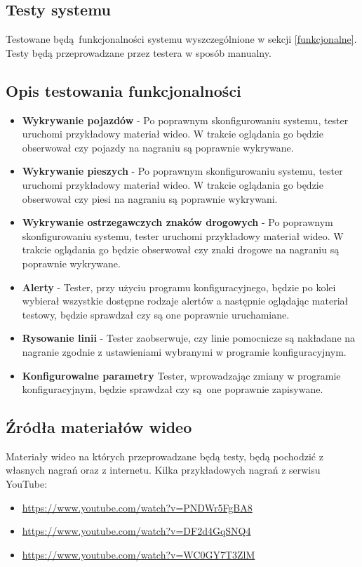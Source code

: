 \subsection{Testy systemu}
Testowane będą funkcjonalności systemu wyszczególnione w sekcji \ref{funkcjonalne}. \newline
Testy będą przeprowadzane przez testera w sposób manualny.

\subsection{Opis testowania funkcjonalności}
\begin{itemize}
	\item \textbf{Wykrywanie pojazdów} - Po poprawnym skonfigurowaniu systemu, tester uruchomi przykładowy materiał wideo. W trakcie oglądania go będzie obserwował czy pojazdy na nagraniu są poprawnie wykrywane. 
	\item \textbf{Wykrywanie pieszych} - Po poprawnym skonfigurowaniu systemu, tester uruchomi przykładowy materiał wideo. W trakcie oglądania go będzie obserwował czy piesi na nagraniu są poprawnie wykrywani.
	\item \textbf{Wykrywanie ostrzegawczych znaków drogowych} - Po poprawnym skonfigurowaniu systemu, tester uruchomi przykładowy materiał wideo. W trakcie oglądania go będzie obserwował czy znaki drogowe na nagraniu są poprawnie wykrywane.
	\item \textbf{Alerty} - Tester, przy użyciu programu konfiguracyjnego, będzie po kolei wybierał wszystkie dostępne rodzaje alertów a następnie oglądając materiał testowy, będzie sprawdzał czy są one poprawnie uruchamiane.
	\item \textbf{Rysowanie linii} - Tester zaobserwuje, czy linie pomocnicze są nakładane na nagranie zgodnie z ustawieniami wybranymi w programie konfiguracyjnym.
	\item \textbf{Konfigurowalne parametry} Tester, wprowadzając zmiany w programie konfiguracyjnym, będzie sprawdzał czy są one poprawnie zapisywane.
\end{itemize}


\subsection{Źródła materiałów wideo}
Materiały wideo na których przeprowadzane będą testy, będą pochodzić z własnych nagrań oraz z internetu. \newline
Kilka przykładowych nagrań z serwisu YouTube:
\begin{itemize}
	\item \url{https://www.youtube.com/watch?v=PNDWr5FgBA8}
	\item \url{https://www.youtube.com/watch?v=DF2d4GqSNQ4}
	\item \url{https://www.youtube.com/watch?v=WC0GY7T3ZlM}
\end{itemize}